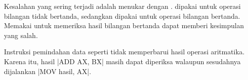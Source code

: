 \begin{peringatanbox}
\vspace{1.1em}
Kesalahan yang sering terjadi adalah menukar  dengan
.  dipakai untuk operasi bilangan tidak bertanda,
sedangkan  dipakai untuk operasi bilangan bertanda. Memakai
 untuk memeriksa hasil bilangan bertanda dapat memberi
kesimpulan yang salah.
\end{peringatanbox}

\begin{infobox}
\vspace{1.1em}
Instruksi pemindahan data seperti  tidak memperbarui
 hasil operasi aritmatika. Karena itu,  hasil
\lstasm|ADD AX, BX| masih dapat diperiksa walaupun sesudahnya
dijalankan \lstasm|MOV hasil, AX|.
\end{infobox}
